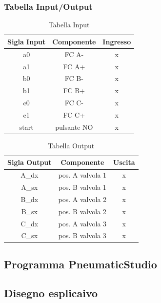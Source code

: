 \documentclass[12pt]{article}
\begin{document}
\subsubsection{Tabella Input/Output}
\begin{table}[H]
	\centering
	\begin{tabular}{|c|c|c|} \hline
		\rowcolor{Blue!80}  Sigla Input     & Componente  & Ingresso \\
		\hline
		\rowcolor{CornflowerBlue!50}  a0    & FC A-       & x        \\
		\hline
		\rowcolor{RoyalBlue!50}    a1       & FC A+       & x        \\
		\hline
		\rowcolor{CornflowerBlue!50}  b0    & FC B-       & x        \\
		\hline
		\rowcolor{RoyalBlue!50}    b1       & FC B+       & x        \\
		\hline
		\rowcolor{CornflowerBlue!50}  c0    & FC C-       & x        \\
		\hline
		\rowcolor{RoyalBlue!50}    c1       & FC C+       & x        \\
		\hline
		\rowcolor{CornflowerBlue!50}  start & pulsante NO & x        \\
		\hline
	\end{tabular}
	\caption{Tabella Input}
\end{table}

\begin{table}[H]
	\centering
	\begin{tabular}{|c|c|c|} \hline
		\rowcolor{Blue!80}  Sigla Output    & Componente       & Uscita \\
		\hline
		\rowcolor{CornflowerBlue!50}  A\_dx & pos. A valvola 1 & x      \\
		\hline
		\rowcolor{RoyalBlue!50}    A\_sx    & pos. B valvola 1 & x      \\
		\hline
		\rowcolor{CornflowerBlue!50}  B\_dx & pos. A valvola 2 & x      \\
		\hline
		\rowcolor{RoyalBlue!50}    B\_sx    & pos. B valvola 2 & x      \\
		\hline
		\rowcolor{CornflowerBlue!50}  C\_dx & pos. A valvola 3 & x      \\
		\hline
		\rowcolor{RoyalBlue!50}    C\_sx    & pos. B valvola 3 & x      \\
		\hline
	\end{tabular}
	\caption{Tabella Output}
\end{table}
\subsection{Programma PneumaticStudio}
\subsection{Disegno esplicaivo}

\newpage
\end{document}
